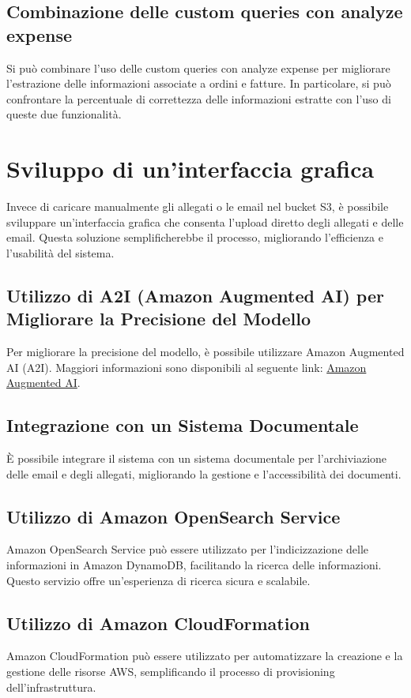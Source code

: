 \subsection{Combinazione delle custom queries con analyze expense}
Si può combinare l'uso delle custom queries con analyze expense per migliorare l'estrazione delle informazioni associate a ordini e fatture. In particolare, si può confrontare la percentuale di correttezza delle informazioni estratte con l'uso di queste due funzionalità.

\section{Sviluppo di un'interfaccia grafica}
Invece di caricare manualmente gli allegati o le email nel bucket S3, è possibile sviluppare un'interfaccia grafica che consenta l'upload diretto degli allegati e delle email. Questa soluzione semplificherebbe il processo, migliorando l'efficienza e l'usabilità del sistema.

\subsection{Utilizzo di A2I (Amazon Augmented AI) per Migliorare la Precisione del Modello}

Per migliorare la precisione del modello, è possibile utilizzare Amazon Augmented AI (A2I). Maggiori informazioni sono disponibili al seguente link: \href{https://aws.amazon.com/it/augmented-ai/}{Amazon Augmented AI}.

\subsection{Integrazione con un Sistema Documentale}

È possibile integrare il sistema con un sistema documentale per l'archiviazione delle email e degli allegati, migliorando la gestione e l'accessibilità dei documenti.

\subsection{Utilizzo di Amazon OpenSearch Service}

Amazon OpenSearch Service può essere utilizzato per l'indicizzazione delle informazioni in Amazon DynamoDB, facilitando la ricerca delle informazioni. Questo servizio offre un'esperienza di ricerca sicura e scalabile.

\subsection{Utilizzo di Amazon CloudFormation}

Amazon CloudFormation può essere utilizzato per automatizzare la creazione e la gestione delle risorse AWS, semplificando il processo di provisioning dell'infrastruttura.